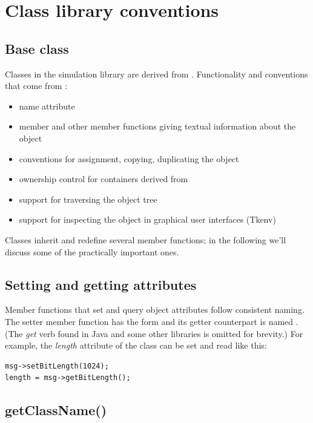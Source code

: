 \section{Class library conventions}

\subsection{Base class}
\label{sec:ch-sim-lib:cobject}


Classes in the {\opp} simulation library are derived from .
Functionality and conventions that come from :
\begin{itemize}
  \item{name attribute}
  \item{ member and other member functions giving textual
    information about the object}
  \item{conventions for assignment, copying, duplicating the object}
  \item{ownership control for containers derived from }
  \item{support for traversing the object tree}
  \item{support for inspecting the object in graphical user interfaces (Tkenv)}
\end{itemize}


Classes inherit and redefine several  member functions;
in the following we'll discuss some of the practically important
ones.


\subsection{Setting and getting attributes}


Member functions that set and query object attributes follow
consistent naming. The setter member function has the form 
and its getter counterpart is named . (The \textit{get} verb found in Java
and some other libraries is omitted for brevity.)
For example, the \textit{length} attribute of the  class can
be set and read like this:

\begin{verbatim}
msg->setBitLength(1024);
length = msg->getBitLength();
\end{verbatim}


\subsection{getClassName()}
\label{sec:sim-lib:classname}


